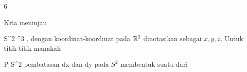 {6}
{

Kita meninjau

\mavergleichskette
{\vergleichskette
{ S^2
}
{ \subseteq }{ \R^3
}
{  }{
}
{    }{
}
{   }{
}
}
{}{}{,}
dengan koordinat-koordinat pada ${\mathbb R}^3$ dinotasikan sebagai $x,y,z$. Untuk titik-titik manakah

\mavergleichskette
{\vergleichskette
{ P
}
{ \in }{ S^2
}
{  }{
}
{    }{
}
{   }{
}
}
{}{}{}
pembatasan
\mathkor {} {dx} {dan} {dy} {}
pada $S^2$ membentuk suatu
dari


}
{} {}
